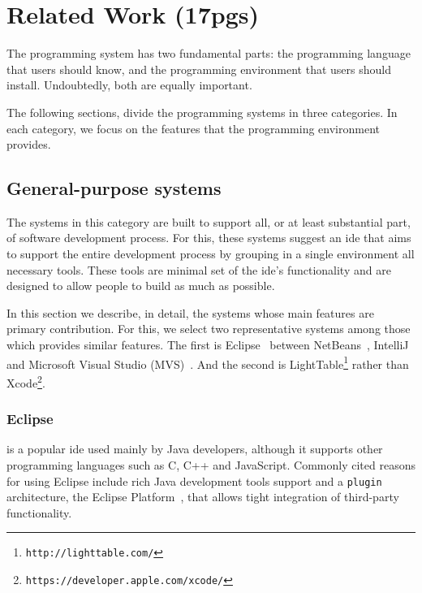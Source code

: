 
% 
% 

\section{Related Work (17pgs)}
\label{sec:rw}
The programming system has two fundamental parts: the programming language that users should know, and the programming environment that users should install. Undoubtedly, both are equally important.

The following sections, divide the programming systems in three categories. In each category, we focus on the features that the programming environment provides.
\subsection{General-purpose systems}

The systems in this category are built to support all, or at least substantial part, of software development process. For this, these systems suggest an \ac{ide} that aims to support the entire development process by grouping in a single environment all necessary tools. These tools are minimal set of the \ac{ide}'s functionality and are designed to allow people to build as much as possible.

In this section we describe, in detail, the systems whose main features are primary contribution. For this, we select two representative systems among those which provides similar features. The first is Eclipse~\cite{carlson2005eclipse} between NetBeans~\cite{boudreau2002netbeans}, IntelliJ~\cite{intellij2001intellij} and Microsoft Visual Studio (MVS)~\cite{guckenheimer2006software}. And the second is LightTable\footnote{\label{lt:note}\texttt{http://lighttable.com/}} rather than Xcode\footnote{\texttt{https://developer.apple.com/xcode/}}.
\subsubsection{Eclipse~\cite{carlson2005eclipse}} is a popular \ac{ide} used mainly by Java developers, although it supports other programming languages such as C, C++ and JavaScript. Commonly cited reasons for using Eclipse include rich Java development tools support and a \texttt{plugin} architecture, the Eclipse Platform~\cite{DesRivieres2004}, that allows tight integration of third-party functionality.

